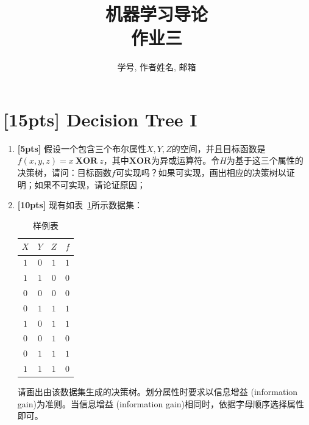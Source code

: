 \documentclass[a4paper,UTF8]{article}
\numberwithin{equation}{section}
\begin{document}
\title{机器学习导论\\
作业三}
\author{学号, 作者姓名, 邮箱}
\maketitle



\section{[15pts] Decision Tree I}

\begin{enumerate}[ {(}1{)}]
	\item \textbf{[5pts]} 假设一个包含三个布尔属性${X, Y, Z}$的空间，并且目标函数是$f(x,y,z) = x\ \mathbf{XOR}\ z$，其中$\mathbf{XOR}$为异或运算符。令$H$为基于这三个属性的决策树，请问：目标函数$f$可实现吗？如果可实现，画出相应的决策树以证明；如果不可实现，请论证原因；
	
	\item \textbf{[10pts]} 现有如表~\ref{table:ranking}所示数据集：
	
	\begin{table}[!h]
		\centering
		\caption{样例表} \vspace{2mm}\label{table:ranking}
		\begin{tabular}{c c c|c}\hline
			$X$ & $Y$ & $Z$ & $f$ \\
			\hline
			$1$ & $0$  & $1$ &  $1$\\
			$1$ & $1$  & $0$ &  $0$\\
			$0$ & $0$  & $0$ &  $0$\\
			$0$ & $1$  & $1$ &  $1$\\
			$1$ & $0$  & $1$ &  $1$\\
			$0$ & $0$  & $1$ &  $0$\\
			$0$ & $1$  & $1$ &  $1$\\
			$1$ & $1$  & $1$ &  $0$\\
			\hline
		\end{tabular}
	\end{table}
	
	请画出由该数据集生成的决策树。划分属性时要求以信息增益 (information gain)为准则。当信息增益 (information gain)相同时，依据字母顺序选择属性即可。
\end{enumerate}
\end{document}
